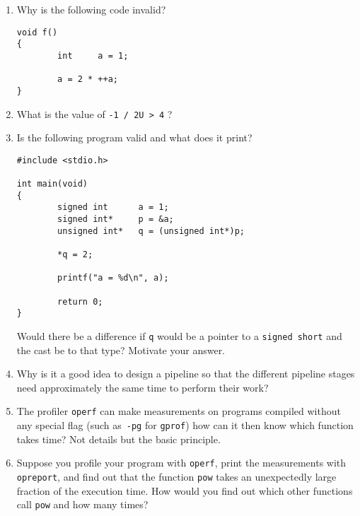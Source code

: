 \documentclass{article}
\begin{document}
\begin{enumerate}
\begin{verbatim}
#define ISDIGIT(c)      ((c) >= '0' && (c) <= '9')

int main()
{
        int     num;    // value of number.
        int     c;      // a char.

        num = 0;

        while (ISDIGIT(c = getchar()))
                num = 10 * num + c - '0';

        printf("the number is %d\n", num);

        return 0;
}
\end{verbatim}

\item Why is the following code invalid?

\begin{verbatim}
void f()
{
        int     a = 1;

        a = 2 * ++a;
}
\end{verbatim}

\item  What is the value of \verb!-1 / 2U > 4! ?

\item Is the following program valid and what does it print?
\begin{verbatim}
#include <stdio.h>

int main(void)
{
        signed int      a = 1;
        signed int*     p = &a;
        unsigned int*   q = (unsigned int*)p;

        *q = 2;

        printf("a = %d\n", a);

        return 0;
}
\end{verbatim}
Would there be a difference if \verb.q. would be a pointer to a
\verb.signed short. and the cast be to that type?
Motivate your answer.

\item Why is it a good idea to design a pipeline so that the different
pipeline stages need approximately the same time to perform their work?

\item The profiler {\tt operf} can make measurements on programs compiled without any special flag (such as~\verb.-pg. for \verb.gprof.)
how can it then know which function takes time? Not details but the basic principle.

\item Suppose you profile your program with {\tt operf}, print the measurements with {\tt opreport},
and find out that the function {\tt pow} takes an unexpectedly large fraction of the execution time.
How would you find out which other functions call {\tt pow} and how many times?


\end{enumerate}
\end{document}
